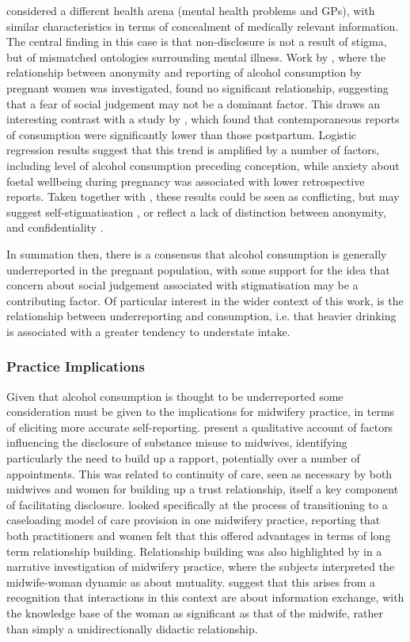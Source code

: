 \citet{Prior2003} considered a different health arena (mental health
problems and GPs), with similar characteristics in terms of concealment
of medically relevant information. The central finding in this case
is that non-disclosure is not a result of stigma, but of mismatched
ontologies surrounding mental illness. Work by \citet{Alvik2005},
where the relationship between anonymity and reporting of alcohol
consumption by pregnant women was investigated, found no significant
relationship, suggesting that a fear of social judgement may not be
a dominant factor. This draws an interesting contrast with a study
by \citet{Alvik2006}, which found that contemporaneous reports of
consumption were significantly lower than those postpartum. Logistic
regression results suggest that this trend is amplified by a number
of factors, including level of alcohol consumption preceding conception,
while anxiety about foetal wellbeing during pregnancy was associated
with lower retrospective reports. Taken together with \citep{Alvik2005},
these results could be seen as conflicting, but may suggest self-stigmatisation
\citep{Watson2007}, or reflect a lack of distinction between anonymity,
and confidentiality \citep{Malvin1983}.

In summation then, there is a consensus that alcohol consumption is
generally underreported in the pregnant population, with some support
for the idea that concern about social judgement associated with stigmatisation
may be a contributing factor. Of particular interest in the wider
context of this work, is the relationship between underreporting and
consumption, i.e. that heavier drinking is associated with a greater
tendency to understate intake.


\subsubsection{Practice Implications}

Given that alcohol consumption is thought to be underreported some
consideration must be given to the implications for midwifery practice,
in terms of eliciting more accurate self-reporting. \citet{Phillips2007}
present a qualitative account of factors influencing the disclosure
of substance misuse to midwives, identifying particularly the need
to build up a rapport, potentially over a number of appointments.
This was related to continuity of care, seen as necessary by both
midwives and women for building up a trust relationship, itself a
key component of facilitating disclosure. \citet{Stevens2002} looked
specifically at the process of transitioning to a caseloading model
of care provision in one midwifery practice, reporting that both practitioners
and women felt that this offered advantages in terms of long term
relationship building. Relationship building was also highlighted
by \citet{Kennedy2004} in a narrative investigation of midwifery
practice, where the subjects interpreted the midwife-woman dynamic
as about mutuality. \citeauthor{Kennedy2004} suggest that this arises
from a recognition that interactions in this context are about information
exchange, with the knowledge base of the woman as significant as that
of the midwife, rather than simply a unidirectionally didactic relationship.


